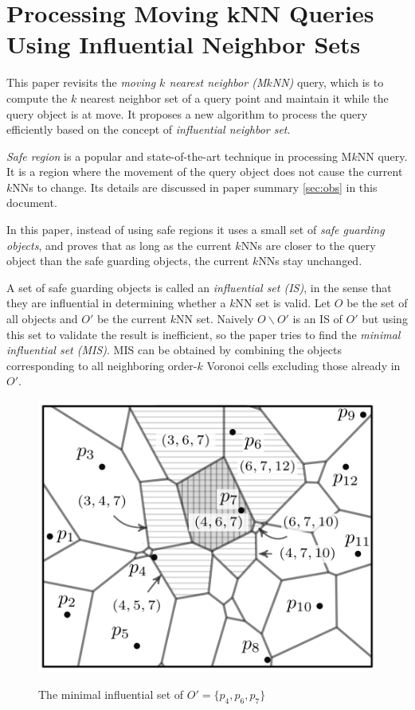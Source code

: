 \documentclass[paper=a4, fontsize=18pt]{article} %
\numberwithin{equation}{section} %
\numberwithin{figure}{section} %
\numberwithin{table}{section} %
\begin{document}
\section{Processing Moving kNN Queries Using Influential Neighbor Sets \cite{Li0QYZ014}}

This paper revisits the \emph{moving $k$ nearest neighbor (M$k$NN)} query, which is to compute the $k$ nearest neighbor set of a query point and maintain it while the query object is at move. It proposes a new algorithm to process the query efficiently based on the concept of \emph{influential neighbor set}.

\emph{Safe region} is a popular and state-of-the-art technique in processing M$k$NN query. It is a region where the movement of the query object does not cause the current $k$NNs to change. Its details are discussed in paper summary \ref{sec:obs} in this document.

In this paper, instead of using safe regions it uses a small set of \emph{safe guarding objects}, and proves that as long as the current $k$NNs are closer to the query object than the safe guarding objects, the current $k$NNs stay unchanged.

A set of safe guarding objects is called an \emph{influential set (IS)}, in the sense that they are influential in determining whether a $k$NN set is valid. Let $O$ be the set of all objects and $O'$ be the current $k$NN set. Naively $O\backslash O'$ is an IS of $O'$ but using this set to validate the result is inefficient, so the paper tries to find the \emph{minimal influential set (MIS)}. MIS can be obtained by combining the objects corresponding to all neighboring order-$k$ Voronoi cells excluding those already in $O'$.

\begin{figure}[h]
  \centering
  \includegraphics[width=.5\linewidth]{8_8_mis.png}\\
  \caption{The minimal influential set of $O' = \{p_4, p_6, p_7\}$}\label{fig:mis}
\end{figure}
\end{document}
